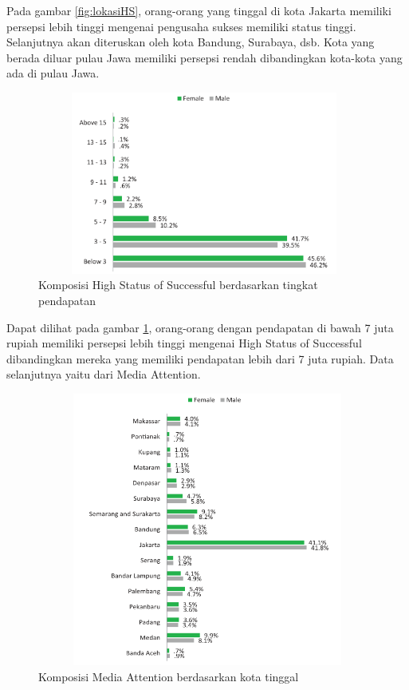 Pada gambar \ref{fig:lokasiHS}, orang-orang yang tinggal di kota Jakarta memiliki persepsi lebih tinggi mengenai pengusaha sukses memiliki status tinggi. Selanjutnya akan diteruskan oleh kota Bandung, Surabaya, dsb. Kota yang berada diluar pulau Jawa memiliki persepsi rendah dibandingkan kota-kota yang ada di pulau Jawa.

\begin{figure} [H]
	\centering  
	\includegraphics[width=11cm, height=6cm]{pendapatanHS2013} 
	\caption[Komposisi High Status of Successful berdasarkan tingkat pendapatan]{Komposisi High Status of Successful berdasarkan tingkat pendapatan} 
	\label{fig:pendapatanHS} 
\end{figure} 

Dapat dilihat pada gambar \ref{fig:pendapatanHS}, orang-orang dengan pendapatan di bawah 7 juta rupiah memiliki persepsi lebih tinggi mengenai High Status of Successful dibandingkan mereka yang memiliki pendapatan lebih dari 7 juta rupiah. Data selanjutnya yaitu dari Media Attention.


\begin{figure} [H]
	\centering  
	\includegraphics[width=12cm, height=9cm]{lokasiPMA2013} 
	\caption[Komposisi Media Attention berdasarkan kota tinggal]{Komposisi Media Attention berdasarkan kota tinggal} 
	\label{fig:lokasiPMA} 
\end{figure} 

